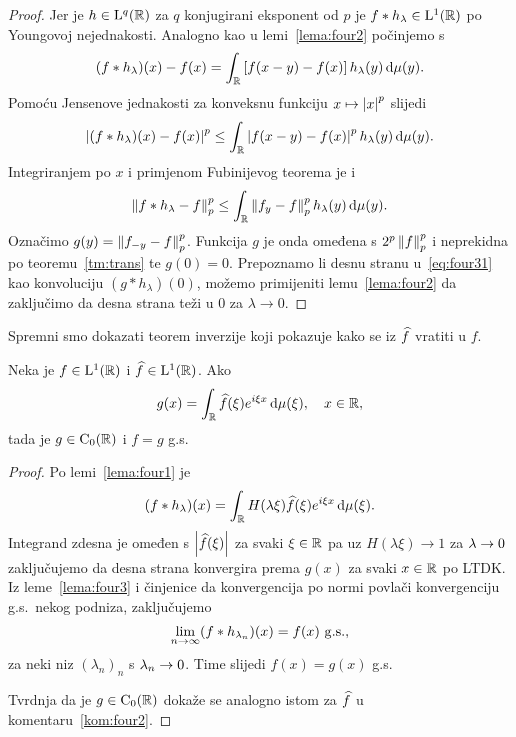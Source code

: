 \documentclass[main.tex]{subfiles}
\begin{document}
\begin{proof}
	Jer je \( h \in \mathrm{L}^q(\mathbb{R}) \) za \( q \) konjugirani eksponent od \( p \) je
	\( f * h_\lambda \in \mathrm{L}^1(\mathbb{R}) \) po Youngovoj nejednakosti. Analogno kao u lemi~\ref{lema:four2}
	počinjemo s
	\begin{equation}
		(f*h_\lambda)(x) - f(x) = \int_{\mathbb{R}} \left[ f(x-y)-f(x) \right] h_\lambda(y) \,\mathrm d \mu (y).
	\end{equation}
	Pomoću Jensenove jednakosti za konveksnu funkciju \( x \mapsto \left| {x} \right| ^p \) slijedi
	\begin{equation}
		\left| {(f*h_\lambda)(x)-f(x)} \right|^p \le \int_{\mathbb{R}} \left| {f(x-y)-f(x)} \right|^p h_\lambda(y) \,\mathrm d\mu(y).
	\end{equation}
	Integriranjem po \( x \) i primjenom Fubinijevog teorema je i
	\begin{equation}\label{eq:four31}
		\left\lVert f*h_\lambda - f\right\rVert_p^p \le \int_{\mathbb{R}} \left\lVert f_y-f\right\rVert_p^p h_\lambda(y) \,\mathrm d\mu(y).
	\end{equation}
	Označimo \( g(y) = \left\lVert f_{-y}-f\right\rVert_p^p \). Funkcija \( g \) je onda
	omeđena s \( 2^p\left\lVert f\right\rVert_p^p \) i neprekidna po teoremu~\ref{tm:trans}
	te \( g(0)=0 \). Prepoznamo li desnu stranu u~\eqref{eq:four31} kao
	konvoluciju \( (g*h_\lambda)(0) \), možemo primijeniti lemu~\ref{lema:four2}
	da zaključimo da desna strana teži u \( 0 \) za \( \lambda \rightarrow 0 \).
\end{proof}

Spremni smo dokazati teorem inverzije koji pokazuje
kako se iz \( \widehat{f} \) vratiti u \( f \).

\begin{teorem}\label{tm:inverzije}
	Neka je \( f \in \mathrm{L}^1(\mathbb{R}) \) i \( \widehat{f} \in \mathrm{L}^1(\mathbb{R}) \). Ako
	\begin{equation}\label{eq:four-inverzija}
		g(x) = \int_{\mathbb{R}} \widehat{f}(\xi) e^{i \xi x} \,\mathrm d \mu(\xi), \quad x \in \mathbb{R},
	\end{equation}
	tada je \( g \in \mathrm{C}_0(\mathbb{R}) \) i \( f=g \) g.s.
\end{teorem}

\begin{proof}
	Po lemi~\ref{lema:four1} je
	\begin{equation}
		(f * h_\lambda)(x) = \int_{\mathbb{R}} H(\lambda \xi) \widehat{f} (\xi) e^{i \xi x} \,\mathrm d \mu(\xi).
	\end{equation}
	Integrand zdesna je omeđen s \( \left| {\widehat{f}(\xi)} \right| \) za svaki \( \xi \in \mathbb{R} \)
	pa uz \( H(\lambda \xi) \rightarrow 1 \) za \( \lambda \rightarrow 0 \) zaključujemo da desna
	strana konvergira prema \( g(x) \) za svaki \( x \in \mathbb{R} \) po LTDK. Iz
	leme~\ref{lema:four3} i činjenice da konvergencija po normi
	povlači konvergenciju g.s.\ nekog podniza, zaključujemo
	\begin{equation}
		\lim\limits_{n \rightarrow \infty} (f * h_{\lambda_n})(x) = f(x) \ \mathrm{g.s.},
	\end{equation}
	za neki niz \( (\lambda_n)_n \) s \( \lambda_n \rightarrow 0 \). Time
	slijedi  \( f(x) = g(x) \) g.s.

	Tvrdnja da je \( g \in \mathrm{C}_0(\mathbb{R}) \) dokaže se analogno
	istom za \( \widehat{f} \) u komentaru~\ref{kom:four2}.
\end{proof}
\end{document}
